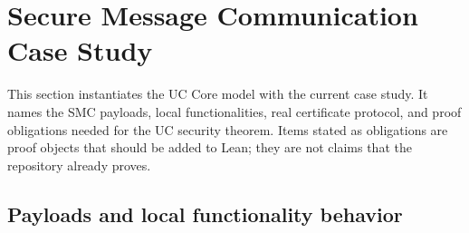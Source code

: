 \section{Secure Message Communication Case Study}

\newcommand{\RealSMC}{\mathsf{RealSMC}}
\newcommand{\IdealSMC}{\mathsf{IdealSMC}}
\newcommand{\IdealProt}{\mathsf{IdealProt}}
\newcommand{\SimSMC}{\mathsf{SimSMC}}
\newcommand{\DDHReal}{\mathsf{DDHReal}}
\newcommand{\DDHRand}{\mathsf{DDHRand}}
\newcommand{\ChalReal}{\mathsf{ChalReal}}
\newcommand{\ChalRand}{\mathsf{ChalRand}}
\newcommand{\Diff}{\mathsf{Diff}}
\newcommand{\SMCChalOut}{\mathsf{SMCChalOut}}
\newcommand{\DDHWit}{\mathsf{DDHWit}}
\newcommand{\UCComp}{\mathsf{UCComp}}
\newcommand{\SimC}{\mathsf{SimC}}
\newcommand{\Payload}{\mathsf{SMCEasyUCPayload}}
\newcommand{\RealKE}{\mathsf{RealKE}}
\newcommand{\IdealKE}{\mathsf{IdealKE}}
\newcommand{\SimKE}{\mathsf{SimKE}}
\newcommand{\PhiKE}{\mathsf{IdealKEProtocol}}
\newcommand{\Hyb}{\mathsf{H}}
\newcommand{\ChalROut}{\mathsf{ChalRealOut}}
\newcommand{\ChalIOut}{\mathsf{ChalIdealOut}}

This section instantiates the UC Core model with the current
 case study.  It names the SMC payloads, local
functionalities, real certificate protocol, and proof obligations needed for
the UC security theorem.  Items stated as obligations are proof objects that
should be added to Lean; they are not claims that the repository already proves.

\subsection{Payloads and local functionality behavior}

